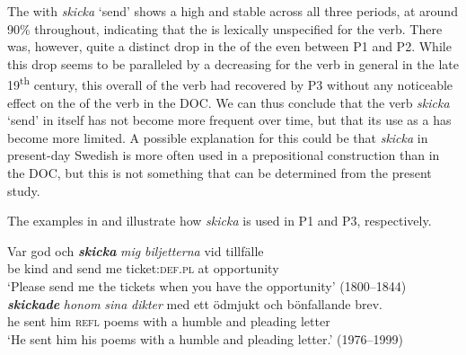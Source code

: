 \documentclass[output=paper]{langscibook}
\begin{document}
\label{sec:valdeson:5.3.3.6}\largerpage[2]
The  with \textit{skicka} ‘send’ shows a high and stable  across all three periods, at around 90\% throughout, indicating that the  is lexically unspecified for the verb. There was, however, quite a distinct drop in the  of the  even between P1 and P2. While this drop seems to be paralleled by a decreasing  for the verb in general in the late 19\textsuperscript{th} century, this overall  of the verb had recovered by P3 without any noticeable effect on the  of the verb in the DOC. We can thus conclude that the verb \textit{skicka} ‘send’ in itself has not become more frequent over time, but that its use as a  has become more limited. A possible explanation for this could be that \textit{skicka} in present-day Swedish is more often used in a prepositional construction than in the DOC, but this is not something that can be determined from the present study.


\begin{table}
\caption{Frequency measures of the verb-specific DOC with \textit{skicka} ‘send’}
\label{tab:valdeson:19}
\end{table}

The examples in  and  illustrate how \textit{skicka} is used in P1 and P3, respectively.


\ea \label{ex:valdeson:30}
\gll Var   god     och \textbf{\textit{skicka}} \textit{mig} \textit{biljetterna} {vid} {tillfälle}\\
  be        kind    and  send       me   ticket:\textsc{def.pl} at       opportunity\\
\glt `Please send me the tickets when you have the opportunity’ (1800–1844)
\ex \label{ex:valdeson:31}
 \textbf{\textit{skickade}} \textit{honom} \textit{sina} \textit{dikter} med     ett   ödmjukt och bönfallande   brev.\\
  he     sent         him       \textsc{refl}   poems with     a         humble   and pleading     letter\\
\glt `He sent him his poems with a humble and pleading letter.’ (1976–1999)
\z
\end{document}
